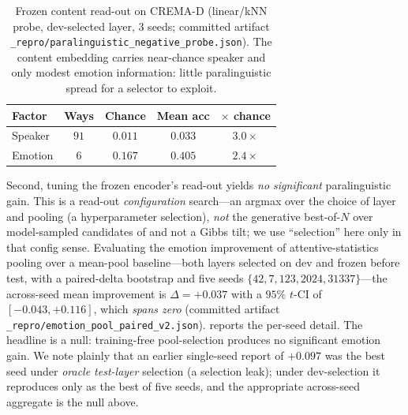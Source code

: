 \begin{table}[t]
\centering
\caption{Frozen content read-out on CREMA-D (linear/kNN probe, dev-selected layer, $3$ seeds; committed artifact \texttt{\_repro/paralinguistic\_negative\_probe.json}). The content embedding carries near-chance speaker and only modest emotion information: little paralinguistic spread for a selector to exploit.}
\label{tab:para}
\begin{tabular}{lcccc}
\toprule
Factor & Ways & Chance & Mean acc & $\times$ chance \\
\midrule
Speaker & $91$ & $0.011$ & $0.033$ & $3.0\times$ \\
Emotion & $6$  & $0.167$ & $0.405$ & $2.4\times$ \\
\bottomrule
\end{tabular}
\end{table}

Second, tuning the frozen encoder's read-out yields \emph{no significant} paralinguistic gain. This is a read-out \emph{configuration} search---an argmax over the choice of layer and pooling (a hyperparameter selection), \emph{not} the generative best-of-$N$ over model-sampled candidates of  and not a Gibbs tilt; we use ``selection'' here only in that config sense. Evaluating the emotion improvement of attentive-statistics pooling over a mean-pool baseline---both layers selected on dev and frozen before test, with a paired-delta bootstrap and five seeds $\{42,7,123,2024,31337\}$---the across-seed mean improvement is $\Delta=+0.037$ with a $95\%$ $t$-CI of $[-0.043,+0.116]$, which \emph{spans zero} (committed artifact \texttt{\_repro/emotion\_pool\_paired\_v2.json}).  reports the per-seed detail. The headline is a null: training-free pool-selection produces no significant emotion gain. We note plainly that an earlier single-seed report of $+0.097$ was the best seed under \emph{oracle test-layer} selection (a selection leak); under dev-selection it reproduces only as the best of five seeds, and the appropriate across-seed aggregate is the null above.

